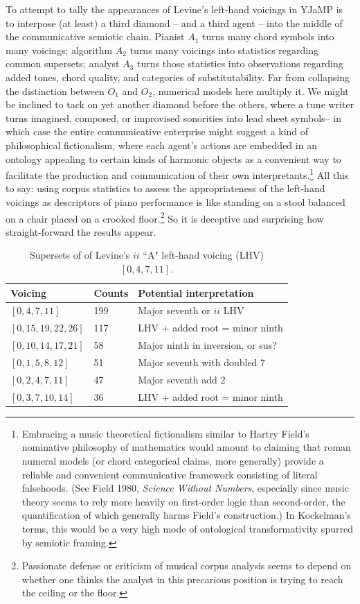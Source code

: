 To attempt to tally the appearances of Levine's left-hand voicings in YJaMP is to interpose (at least) a third diamond -- and a third agent -- into the middle of the communicative semiotic chain.  Pianist $A_1$ turns many chord symbols into many voicings; algorithm $A_2$ turns many voicings into statistics regarding common supersets; analyst $A_3$ turns those statistics into observations regarding added tones, chord quality, and categories of substitutability.  Far from collapsing the distinction between $O_1$ and $O_2$, numerical models here multiply it.  We might be inclined to tack on yet another diamond before the others, where a tune writer turns imagined, composed, or improvised sonorities into lead sheet symbols-- in which case the entire communicative enterprise might suggest a kind of philosophical fictionalism, where each agent's actions are embedded in an ontology appealing to certain kinds of harmonic objects as a convenient way to facilitate the production and communication of their own interpretants.\footnote{Embracing a music theoretical fictionalism similar to Hartry Field's nominative philosophy of mathematics would amount to claiming that roman numeral models (or chord categorical claims, more generally) provide a reliable and convenient communicative framework consisting of literal falsehoods.  (See Field 1980, \emph{Science Without Numbers}, especially since music theory seems to rely more heavily on first-order logic than second-order, the quantification of which generally harms Field's construction.)  In Kockelman's terms, this would be a very high mode of ontological transformativity spurred by semiotic framing.}  All this to say: using corpus statistics to assess the appropriateness of the left-hand voicings as descriptors of piano performance is like standing on a stool balanced on a chair placed on a crooked floor.\footnote{Passionate defense or criticism of musical corpus analysis seems to depend on whether one thinks the analyst in this precarious position is trying to reach the ceiling or the floor.}  So it is deceptive and surprising how straight-forward the results appear.

\begin{table}%
  \caption{Supersets of of Levine's $ii$ ``A" left-hand voicing (LHV) $[0,4,7,11]$.}
  \centering
\begin{tabular}{l| l | l}
\hline\hline
Voicing & Counts & Potential interpretation \\ [0.5ex]
\hline
$[0,4,7,11]$ & 199 & Major seventh or $ii$ LHV\\
$[0,15,19,22,26]$ & 117 & LHV + added root = minor ninth \\
$[0,10,14,17,21]$ & 58 & Major ninth in inversion, or sus? \\
$[0,1,5,8,12]$ & 51 & Major seventh with doubled 7 \\
$[0,2,4,7,11]$ & 47 & Major seventh add 2 \\
$[0,3,7,10,14]$ & 36 & LHV + added root = minor ninth \\[1ex]
\hline
\end{tabular}
\label{a_ii_lhv}
\end{table}

